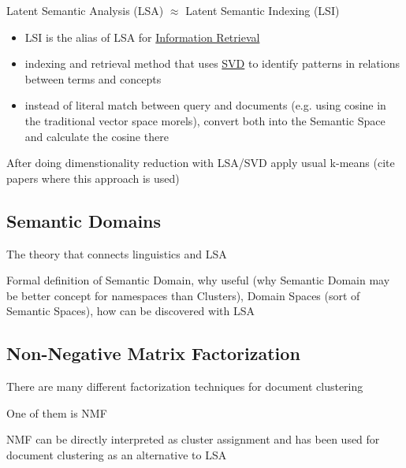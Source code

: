 Latent Semantic Analysis (LSA) $\approx$ Latent Semantic Indexing (LSI)

\begin{itemize}
\itemsep1pt\parskip0pt
\item
  LSI is the alias of LSA for \href{Information Retrieval}{Information   Retrieval}
\item
  indexing and retrieval method that uses
  \href{Singular Value Decomposition}{SVD} to identify patterns in
  relations between terms and concepts
\item
  instead of literal match between query and documents (e.g. using
  cosine in the traditional vector space morels), convert both into the
  Semantic Space and calculate the cosine there
\end{itemize}



After doing dimenstionality reduction with LSA/SVD apply usual k-means (cite papers where 
this approach is used) 



\subsection{Semantic Domains}

The theory that connects linguistics and LSA \cite{gliozzo2009semantic}

Formal definition of Semantic Domain, why useful (why Semantic Domain may 
be better concept for namespaces than Clusters), 
Domain Spaces (sort of Semantic Spaces), how can be discovered with LSA




\subsection{Non-Negative Matrix Factorization}

There are many different factorization techniques for document clustering \cite{osinski2006improving}

One of them is NMF \cite{lee1999nnmf}

NMF can be directly interpreted as cluster assignment and has been 
used for document clustering as an alternative to LSA \cite{xu2003document}





